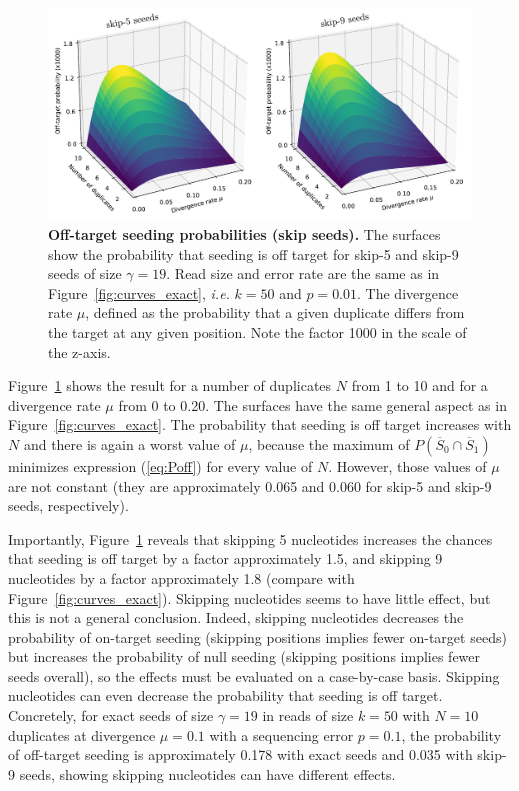 \documentclass{article}
\begin{document}
\begin{figure}[h]
\centering
\includegraphics[scale=0.47]{curves_skip.pdf}
\caption{\textbf{Off-target seeding probabilities (skip seeds).}
The surfaces show the probability that seeding is off target for skip-5
and skip-9 seeds of size $\gamma=19$. Read size and error rate are the
same as in Figure~\ref{fig:curves_exact}, \textit{i.e.} $k=50$ and
$p=0.01$. The divergence rate $\mu$, defined as the probability that a
given duplicate differs from the target at any given position. Note the
factor 1000 in the scale of the z-axis.}
\label{fig:curves_skip}
\end{figure}

Figure~\ref{fig:curves_skip} shows the result for a number of duplicates $N$
from 1 to 10 and for a divergence rate $\mu$ from 0 to 0.20. The surfaces
have the same general aspect as in Figure~\ref{fig:curves_exact}. The
probability that seeding is off target increases with $N$ and there is
again a  worst value of $\mu$, because the maximum of $P(\overline{S}_0
\cap \overline{S}_1)$ minimizes expression (\ref{eq:Poff}) for every value
of $N$. However, those values of $\mu$ are not constant (they are
approximately 0.065 and 0.060 for skip-5 and skip-9 seeds, respectively).

Importantly, Figure~\ref{fig:curves_skip} reveals that skipping 5
nucleotides increases the chances that seeding is off target by a factor
approximately 1.5, and skipping 9 nucleotides by a factor approximately
1.8 (compare with Figure~\ref{fig:curves_exact}). Skipping nucleotides
seems to have little effect, but this is not a general conclusion. Indeed,
skipping nucleotides decreases the probability of on-target seeding
(skipping positions implies fewer on-target seeds) but increases the
probability of null seeding (skipping positions implies fewer seeds
overall), so the effects must be evaluated on a case-by-case basis.
Skipping nucleotides can even decrease the probability that seeding is
off target. Concretely, for exact seeds of size $\gamma=19$ in reads of
size $k=50$ with $N=10$ duplicates at divergence $\mu=0.1$ with a
sequencing error $p=0.1$, the probability of off-target seeding is
approximately 0.178 with exact seeds and 0.035 with skip-9 seeds, showing
skipping nucleotides can have different effects.
\end{document}
